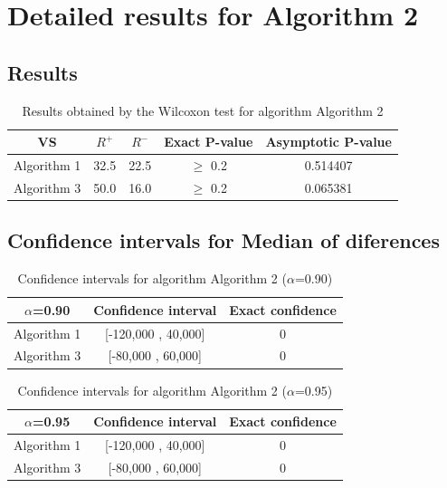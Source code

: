 \documentclass[a4paper,10pt]{article}
\begin{document}
 \clearpage 


\section{Detailed results for Algorithm 2}


\subsection{Results}

\begin{table}[!htp]
\centering\small
\begin{tabular}{
|c|c|c|c|c|}
\hline
 VS & $R^{+}$ & $R^{-}$ & Exact P-value & Asymptotic P-value \\ \hline 
Algorithm 1 & 32.5 & 22.5 & $\geq$ 0.2 & 0.514407\\ \hline 
Algorithm 3 & 50.0 & 16.0 & $\geq$ 0.2 & 0.065381\\ \hline 

\end{tabular}
\caption{Results obtained by the Wilcoxon test for algorithm Algorithm 2}
\end{table}

\subsection{Confidence intervals for Median of diferences}

\begin{table}[!htp]
\centering\small
\begin{tabular}{
|c|c|c|}
\hline
 $\alpha$=0.90 & Confidence interval & Exact confidence \\ \hline 
Algorithm 1 & [-120,000 , 40,000] & 0\\ \hline 
Algorithm 3 & [-80,000 , 60,000] & 0\\ \hline 

\end{tabular}
\caption{Confidence intervals for algorithm Algorithm 2 ($\alpha$=0.90)}
\end{table}
\begin{table}[!htp]
\centering\small
\begin{tabular}{
|c|c|c|}
\hline
 $\alpha$=0.95 & Confidence interval & Exact confidence \\ \hline 
Algorithm 1 & [-120,000 , 40,000] & 0\\ \hline 
Algorithm 3 & [-80,000 , 60,000] & 0\\ \hline 

\end{tabular}
\caption{Confidence intervals for algorithm Algorithm 2 ($\alpha$=0.95)}
\end{table}
\end{document}
